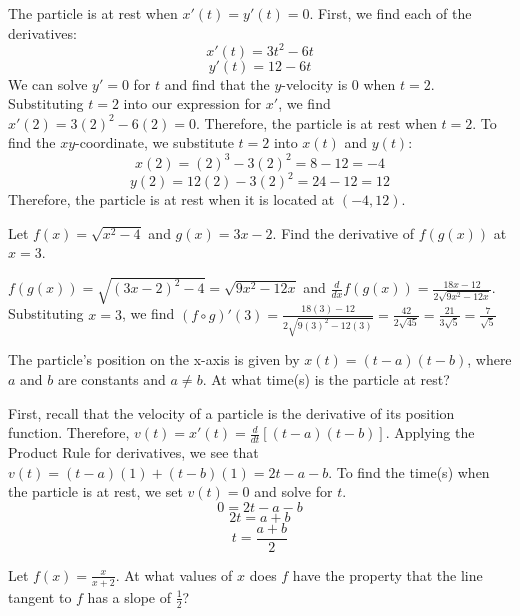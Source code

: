 \begin{Answer}[ref=deriv_rules3]
	The particle is at rest when $x'(t) = y'(t) = 0$. First, we find each
	of the derivatives:\\
	$$x'(t) = 3t^2 - 6t$$
	$$y'(t) = 12 - 6t$$
	We can solve $y' = 0$ for $t$ and find that the $y$-velocity is $0$ 
	when $t=2$. Substituting $t=2$ into our expression for $x'$, we find 
	$x'(2) = 3(2)^2 - 6(2) = 0$. Therefore, the particle is at rest when 
	$t=2$. To find the $xy$-coordinate, we substitute $t=2$ into $x(t)$ 
	and $y(t)$:\\
	$$x(2) = (2)^3 - 3(2)^2 = 8 - 12 = -4$$
	$$y(2) = 12(2) - 3(2)^2 = 24 - 12 = 12$$
	Therefore, the particle is at rest when it is located at $(-4, 12)$. 
\end{Answer}

\begin{Exercise}
    [label=deriv_rules4]
    Let $f(x) = \sqrt{x^2-4}$ and $g(x) = 3x-2$. Find the derivative 
    of $f(g(x))$ at $x=3$.
\end{Exercise}
\begin{Answer}
    [ref=deriv_rules4]
    $f(g(x)) = \sqrt{(3x - 2)^2 - 4} = \sqrt{9x^2 - 12x}$ and 
    $\frac{d}{dx}f(g(x)) = \frac{18x - 12}{2\sqrt{9x^2 - 12x}}$. 
    Substituting $x = 3$, we find $(f \circ g)'(3) = \frac{18(3) - 12}{2
    \sqrt{9(3)^2 - 12(3)}} = \frac{42}{2\sqrt{45}} = 
    \frac{21}{3\sqrt{5}} = \frac{7}{\sqrt{5}}$
\end{Answer}

\begin{Exercise}
    [label=deriv_rules5]
    The particle's position on the x-axis is given by $x(t) = 
    (t - a)(t - b)$, where $a$ and $b$ are constants and $a \neq b$. 
    At what time(s) is the particle at rest?
\end{Exercise}
\begin{Answer}
    [ref=deriv_rules5]
    First, recall that the velocity of a particle is the derivative of 
    its position function. Therefore, $v(t) = x'(t) = 
    \frac{d}{dt}[(t - a)(t - b)]$. Applying the Product Rule for 
    derivatives, we see that $v(t) = (t - a)(1) + (t - b)(1) = 2t - a 
    - b$. To find the time(s) when the particle is at rest, we set 
    $v(t) = 0$ and solve for $t$. 
    $$0 = 2t - a - b$$ 
    $$2t = a + b$$ 
    $$t = \frac{a + b}{2}$$
\end{Answer}

\begin{Exercise}
     Let 
    $f(x) = \frac{x}{x + 2}$. At what values of $x$ does $f$ have the 
    property that the line tangent to $f$ has a slope of $\frac{1}{2}$?
\end{Exercise}

